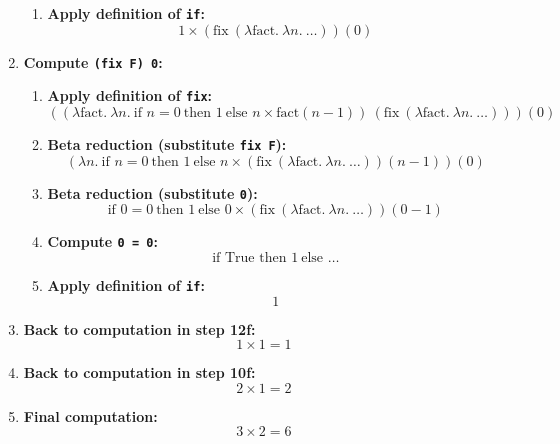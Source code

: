 \documentclass{article}
\begin{document}
\begin{enumerate}
\begin{enumerate}
        \item \textbf{Apply definition of \texttt{if}:}
        \begin{equation*}
        1 \times \left( \text{fix}\ (\lambda \text{fact}.\ \lambda n.\ \ldots) \right)(0)
        \end{equation*}
    \end{enumerate}
    \item \textbf{Compute \texttt{(fix F) 0}:}
    \begin{enumerate}
        \item \textbf{Apply definition of \texttt{fix}:}
        \begin{equation*}
        \left( (\lambda \text{fact}.\ \lambda n.\ \text{if } n = 0\ \text{then } 1\ \text{else } n \times \text{fact}(n - 1))\ \left( \text{fix}\ (\lambda \text{fact}.\ \lambda n.\ \ldots) \right) \right)(0)
        \end{equation*}
        \item \textbf{Beta reduction (substitute \texttt{fix F}):}
        \begin{equation*}
        \left( \lambda n.\ \text{if } n = 0\ \text{then } 1\ \text{else } n \times \left( \text{fix}\ (\lambda \text{fact}.\ \lambda n.\ \ldots) \right)(n - 1) \right)(0)
        \end{equation*}
        \item \textbf{Beta reduction (substitute \texttt{0}):}
        \begin{equation*}
        \text{if } 0 = 0\ \text{then } 1\ \text{else } 0 \times \left( \text{fix}\ (\lambda \text{fact}.\ \lambda n.\ \ldots) \right)(0 - 1)
        \end{equation*}
        \item \textbf{Compute \texttt{0 = 0}:}
        \begin{equation*}
        \text{if True then } 1\ \text{else }\ldots
        \end{equation*}
        \item \textbf{Apply definition of \texttt{if}:}
        \begin{equation*}
        1
        \end{equation*}
    \end{enumerate}
    \item \textbf{Back to computation in step 12f:}
    \begin{equation*}
    1 \times 1 = 1
    \end{equation*}
    \item \textbf{Back to computation in step 10f:}
    \begin{equation*}
    2 \times 1 = 2
    \end{equation*}
    \item \textbf{Final computation:}
    \begin{equation*}
    3 \times 2 = 6
    \end{equation*}
\end{enumerate}
\end{document}
